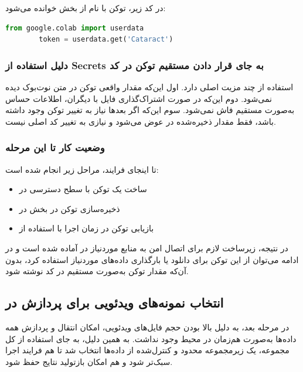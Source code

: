 \documentclass{article}
\begin{document}
در کد زیر، توکن با نام  از بخش  خوانده می‌شود:

\begin{latin}
	\begin{lstlisting}[language=Python, basicstyle=\ttfamily\scriptsize]
		from google.colab import userdata
		token = userdata.get('Cataract')
	\end{lstlisting}
\end{latin}

\subsubsection{دلیل استفاده از Secrets به جای قرار دادن مستقیم توکن در کد}

استفاده از  چند مزیت اصلی دارد. اول این‌که مقدار واقعی توکن در متن نوت‌بوک دیده نمی‌شود. دوم این‌که در صورت اشتراک‌گذاری فایل با دیگران، اطلاعات حساس به‌صورت مستقیم فاش نمی‌شود. سوم این‌که اگر بعدها نیاز به تغییر توکن وجود داشته باشد، فقط مقدار ذخیره‌شده در  عوض می‌شود و نیازی به تغییر کد اصلی نیست.

\subsubsection{وضعیت کار تا این مرحله}

تا اینجای فرایند، مراحل زیر انجام شده است:
\begin{itemize}
	\item ساخت یک توکن با سطح دسترسی  در 
	\item ذخیره‌سازی توکن در بخش  در 
	\item بازیابی توکن در زمان اجرا با استفاده از 
\end{itemize}


در نتیجه، زیرساخت لازم برای اتصال امن به منابع موردنیاز در  آماده شده است و در ادامه می‌توان از این توکن برای دانلود یا بارگذاری داده‌های موردنیاز استفاده کرد، بدون آن‌که مقدار توکن به‌صورت مستقیم در کد نوشته شود.


\subsection{انتخاب نمونه‌های ویدئویی برای پردازش در }

در مرحله بعد، به دلیل بالا بودن حجم فایل‌های ویدئویی، امکان انتقال و پردازش همه داده‌ها به‌صورت هم‌زمان در محیط  وجود نداشت. به همین دلیل، به جای استفاده از کل مجموعه، یک زیرمجموعه محدود و کنترل‌شده از داده‌ها انتخاب شد تا هم فرایند اجرا سبک‌تر شود و هم امکان بازتولید نتایج حفظ شود.
\end{document}
